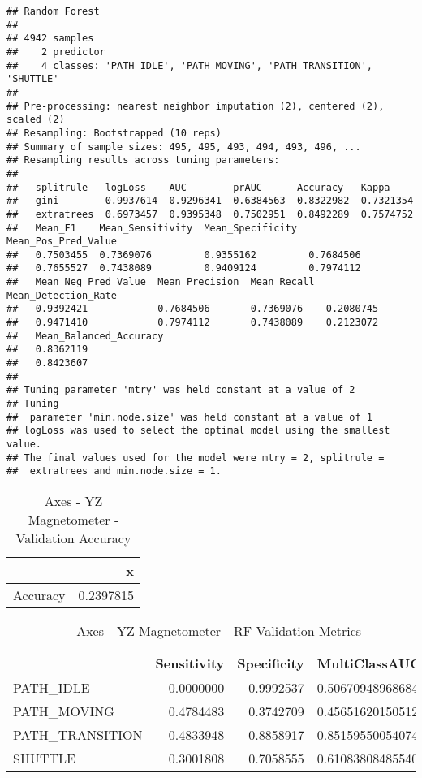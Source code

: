 \documentclass[]{article}
\begin{document}
\begin{verbatim}
## Random Forest 
## 
## 4942 samples
##    2 predictor
##    4 classes: 'PATH_IDLE', 'PATH_MOVING', 'PATH_TRANSITION', 'SHUTTLE' 
## 
## Pre-processing: nearest neighbor imputation (2), centered (2), scaled (2) 
## Resampling: Bootstrapped (10 reps) 
## Summary of sample sizes: 495, 495, 493, 494, 493, 496, ... 
## Resampling results across tuning parameters:
## 
##   splitrule   logLoss    AUC        prAUC      Accuracy   Kappa    
##   gini        0.9937614  0.9296341  0.6384563  0.8322982  0.7321354
##   extratrees  0.6973457  0.9395348  0.7502951  0.8492289  0.7574752
##   Mean_F1    Mean_Sensitivity  Mean_Specificity  Mean_Pos_Pred_Value
##   0.7503455  0.7369076         0.9355162         0.7684506          
##   0.7655527  0.7438089         0.9409124         0.7974112          
##   Mean_Neg_Pred_Value  Mean_Precision  Mean_Recall  Mean_Detection_Rate
##   0.9392421            0.7684506       0.7369076    0.2080745          
##   0.9471410            0.7974112       0.7438089    0.2123072          
##   Mean_Balanced_Accuracy
##   0.8362119             
##   0.8423607             
## 
## Tuning parameter 'mtry' was held constant at a value of 2
## Tuning
##  parameter 'min.node.size' was held constant at a value of 1
## logLoss was used to select the optimal model using the smallest value.
## The final values used for the model were mtry = 2, splitrule =
##  extratrees and min.node.size = 1.
\end{verbatim}

\begin{table}[!h]

\caption{\label{tab:sensor-yz-mag-rf-results}Axes - YZ Magnetometer - Validation Accuracy}
\centering
\begin{tabular}[t]{lr}
\toprule
  & x\\
\midrule
Accuracy & 0.2397815\\
\bottomrule
\end{tabular}
\end{table}

\begin{table}[!h]

\caption{\label{tab:sensor-yz-mag-rf-results}Axes - YZ Magnetometer - RF Validation Metrics}
\centering
\begin{tabular}[t]{lrrl}
\toprule
  & Sensitivity & Specificity & MultiClassAUC\\
\midrule
PATH\_IDLE & 0.0000000 & 0.9992537 & 0.506709489686844\\
PATH\_MOVING & 0.4784483 & 0.3742709 & 0.456516201505129\\
PATH\_TRANSITION & 0.4833948 & 0.8858917 & 0.851595500540747\\
SHUTTLE & 0.3001808 & 0.7058555 & 0.610838084855407\\
\bottomrule
\end{tabular}
\end{table}
\end{document}
